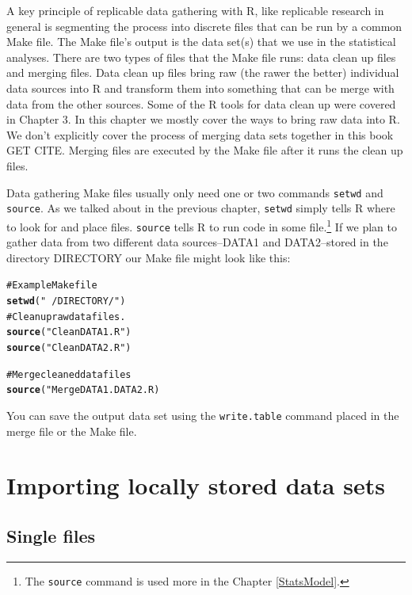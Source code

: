 \documentclass[ChapterTOCs,krantz1]{krantz}\usepackage{graphicx, color}
\makeatletter
\newcommand{\hlfunctioncall}[1]{\textcolor[rgb]{0.501960784313725,0,0.329411764705882}{\textbf{#1}}}%
\newcommand{\hlstring}[1]{\textcolor[rgb]{0.6,0.6,1}{#1}}%
\newcommand{\hlcomment}[1]{\textcolor[rgb]{0.180392156862745,0.6,0.341176470588235}{#1}}%
\newenvironment{kframe}{%
 \def\at@end@of@kframe{}%
 \ifinner\ifhmode%
  \def\at@end@of@kframe{\end{minipage}}%
  \begin{minipage}{\columnwidth}%
 \fi\fi%
 \def\FrameCommand##1{\hskip\@totalleftmargin \hskip-\fboxsep
 \colorbox{shadecolor}{##1}\hskip-\fboxsep
     \hskip-\linewidth \hskip-\@totalleftmargin \hskip\columnwidth}%
 \MakeFramed {\advance\hsize-\width
   \@totalleftmargin\z@ \linewidth\hsize
   \@setminipage}}%
 {\par\unskip\endMakeFramed%
 \at@end@of@kframe}
\newenvironment{knitrout}{}{} %
\makeatother
\begin{document}
A key principle of replicable data gathering with R, like replicable research in general is segmenting the process into discrete files that can be run by a common Make file. The Make file's output is the data set(s) that we use in the statistical analyses. There are two types of files that the Make file runs: data clean up files and merging files. Data clean up files bring raw (the rawer the better) individual data sources into R and transform them into something that can be merge with data from the other sources. Some of the R tools for data clean up were covered in Chapter 3. In this chapter we mostly cover the ways to bring raw data into R. We don't explicitly cover the process of merging data sets together in this book GET CITE. Merging files are executed by the Make file after it runs the clean up files.

Data gathering Make files usually only need one or two commands {\tt{setwd}} and {\tt{source}}. As we talked about in the previous chapter, {\tt{setwd}} simply tells R where to look for and place files. {\tt{source}} tells R to run code in some file.\footnote{The {\tt{source}} command is used more in the Chapter \ref{StatsModel}.}  If we plan to gather data from two different data sources--DATA1 and DATA2--stored in the directory DIRECTORY our Make file might look like this:

\begin{knitrout}
\color{fgcolor}\begin{kframe}
\begin{alltt}
\hlcomment{# Example Make file}
\hlfunctioncall{setwd}(\hlstring{"~/DIRECTORY/"})
\hlcomment{# Clean up raw data files.}
\hlfunctioncall{source}(\hlstring{"CleanDATA1.R"})
\hlfunctioncall{source}(\hlstring{"CleanDATA2.R"})
    
\hlcomment{# Merge cleaned data files}
\hlfunctioncall{source}("MergeDATA1.DATA2.R)
\end{alltt}
\end{kframe}
\end{knitrout}


You can save the output data set using the {\tt{write.table}} command placed in the merge file or the Make file.

\section{Importing locally stored data sets}

\subsection{Single files}
\end{document}
